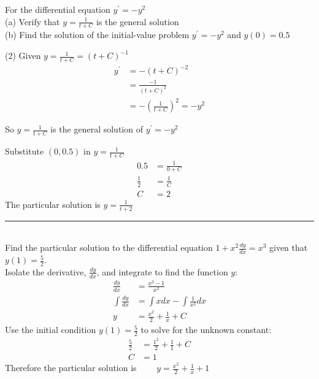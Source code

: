 \example For the differential equation $y^{ \prime } = -y^{2}$ \medskip\\
(a) Verify that $y =\frac{1}{t +C}$ is the general solution \\
(b) Find the solution of the initial-value problem $y^{ \prime } = -y^{2}$ and $y \left (0\right ) =0.5$ 
\clearpage
\solution
\begin{tasks}(2)
\task Given $y =\frac{1}{t +C} =\left (t +C\right )^{ -1}$
\begin{align*}y^{ \prime } &    =  -\left (t +C\right )^{ -2} \\
 &    = \frac{ -1}{\left (t +C\right )^{2}} \\
 &    =  -\genfrac{(}{)}{}{}{1}{t +C}^{2} = -y^{2}\end{align*}

So $y =\frac{1}{t +C}$ is the general solution of $y^{ \prime } = -y^{2}$ 

\task Substitute $\left (0 ,0.5\right )$ in $y =\frac{1}{t +C}$
\begin{align*}0.5 &    = \frac{1}{0 +C} \\
\frac{1}{2} &    = \frac{1}{C} \\
C &    = 2\end{align*}
The particular solution is $y =\frac{1}{t +2}$
\end{tasks}
\rule{\textwidth}{0.5pt}
\examq\\ Find the particular solution to the differential equation $1+x^2\frac{dy}{dx}=x^3$ given that $y(1)=\frac{5}{2}$.\\
\solution Isolate the derivative, $\frac{dy}{dx}$, and integrate to find the function $y$:\\
\begin{align*}
\frac{dy}{dx}&=\frac{x^3-1}{x^2}\\
\int\frac{dy}{dx}&=\int xdx-\int\frac{1}{x^2}dx\\	
y&=\frac{x^2}{2}+\frac{1}{x}+C
\end{align*}
Use the initial condition $y(1)=\frac{5}{2}$ to solve for the unknown constant:\\
	\begin{align*}\frac{5}{2}&=\frac{1^2}{2}+\frac{1}{1}+C\\
	C&=1
	\end{align*}
Therefore the particular solution is $\qquad\displaystyle y=\frac{x^2}{2}+\frac{1}{x}+1$

